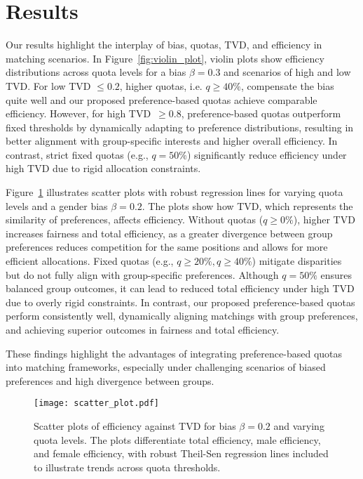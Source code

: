 \documentclass[letterpaper]{article}
\begin{document}
\section{Results}

Our results highlight the interplay of bias, quotas, TVD, and efficiency in matching scenarios.
In Figure~\ref{fig:violin_plot}, violin plots show efficiency distributions across quota levels for a bias \( \beta = 0.3 \) and scenarios of high and low TVD. For low TVD \( \leq 0.2 \), higher quotas, i.e. \( q\geq 40\%\), compensate the bias quite well and our proposed preference-based quotas achieve comparable efficiency. However, for high TVD~\( \geq 0.8 \), preference-based quotas outperform fixed thresholds by dynamically adapting to preference distributions, resulting in better alignment with group-specific interests and higher overall efficiency. In contrast, strict fixed quotas (e.g., \( q = 50\% \)) significantly reduce efficiency under high TVD due to rigid allocation constraints.

Figure~\ref{fig:scatter_plot} illustrates scatter plots with robust regression lines for varying quota levels and a gender bias \( \beta = 0.2 \). The plots show how TVD, which represents the similarity of preferences, affects efficiency. Without quotas (\( q \geq 0\% \)), higher TVD increases fairness and total efficiency, as a greater divergence between group preferences reduces competition for the same positions and allows for more efficient allocations. Fixed quotas (e.g., \( q \geq 20\%, q \geq 40\% \)) mitigate disparities but do not fully align with group-specific preferences. Although \( q = 50\% \) ensures balanced group outcomes, it can lead to reduced total efficiency under high TVD due to overly rigid constraints. In contrast, our proposed preference-based quotas perform consistently well, dynamically aligning matchings with group preferences, and achieving superior outcomes in fairness and total efficiency.

These findings highlight the advantages of integrating preference-based quotas into matching frameworks, especially under challenging scenarios of biased preferences and high divergence between groups.

\begin{figure}[ht]
  \centering
  \texttt{[image: scatter\_plot.pdf]}
\caption{Scatter plots of efficiency against TVD for bias \( \beta = 0.2 \) and varying quota levels. The plots differentiate total efficiency, male efficiency, and female efficiency, with robust Theil-Sen regression lines included to illustrate trends across quota thresholds.}
  \label{fig:scatter_plot}
\end{figure}
\end{document}
